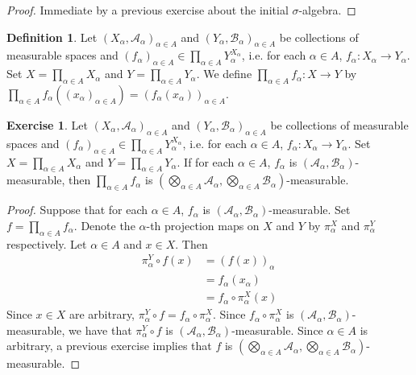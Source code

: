 \documentclass[12pt]{amsart}
\theoremstyle{definition}
\newtheorem{defn}[definition]{Definition}
\newtheorem{ex}[definition]{Exercise}
\newcommand{\al}{\alpha}
\newcommand{\sig}{\sigma}
\newcommand{\MA}{\mathcal{A}}
\newcommand{\MB}{\mathcal{B}}
\begin{document}
	\begin{proof}
		Immediate by a previous exercise about the initial $\sig$-algebra.
	\end{proof}
	
	\begin{defn}
		Let $(X_{\al}, \MA_{\al})_{\al \in A}$ and $(Y_{\al}, \MB_{\al})_{\al \in A}$ be collections of measurable spaces and $(f_{\al})_{\al \in A} \in \prod\limits_{\al \in A} Y_{\al}^{X_{\al}}$, i.e. for each $\al \in A$, $f_{\al}:X_{\al} \rightarrow Y_{\al}$. Set $X = \prod\limits_{\al \in A} X_{\al}$ and $Y = \prod\limits_{\al \in A}Y_{\al}$. We define $\prod_{\al \in A} f_{\al}: X \rightarrow Y$ by $\prod_{\al \in A} f_{\al} ((x_{\al})_{\al \in A}) = (f_{\al}(x_{\al}))_{\al \in A}$.
	\end{defn}
	
	\begin{ex}
		Let $(X_{\al}, \MA_{\al})_{\al \in A}$ and $(Y_{\al}, \MB_{\al})_{\al \in A}$ be collections of measurable spaces and $(f_{\al})_{\al \in A} \in \prod\limits_{\al \in A} Y_{\al}^{X_{\al}}$, i.e. for each $\al \in A$, $f_{\al}:X_{\al} \rightarrow Y_{\al}$. Set $X = \prod\limits_{\al \in A} X_{\al}$ and $Y = \prod\limits_{\al \in A}Y_{\al}$. If for each $\al \in A$, $f_{\al}$ is $(\MA_{\al}, \MB_{\al})$-measurable, then $\prod_{\al \in A} f_{\al}$ is $(\bigotimes\limits_{\al \in A} \MA_{\al}, \bigotimes\limits_{\al \in A} \MB_{\al})$-measurable.
	\end{ex}
	
	\begin{proof} Suppose that for each $\al \in A$, $f_{\al}$ is $(\MA_{\al}, \MB_{\al})$-measurable. Set $f = \prod_{\al \in A} f_{\al}$. Denote the $\al$-th projection maps on $X$ and $Y$ by $\pi^X_{\al}$ and $\pi^Y_{\al}$ respectively. Let $\al \in A$ and $x \in X$. Then
		\begin{align*}
			\pi^Y_{\al} \circ f(x) 
			& = (f(x))_{\al} \\
			& = f_{\al}(x_{\al}) \\
			& = f_{\al} \circ \pi^X_{\al}(x) 
		\end{align*}
		Since $x \in X$ are arbitrary, $\pi^Y_{\al} \circ f = f_{\al} \circ \pi^X_{\al}$. Since $f_{\al} \circ \pi^X_{\al}$ is $(\MA_{\al}, \MB_{\al})$-measurable, we have that $\pi^Y_{\al} \circ f$ is $(\MA_{\al}, \MB_{\al})$-measurable. Since $\al \in A$ is arbitrary, a previous exercise implies that $f$ is $(\bigotimes\limits_{\al \in A} \MA_{\al}, \bigotimes\limits_{\al \in A} \MB_{\al})$-measurable.
	\end{proof}
\end{document}
